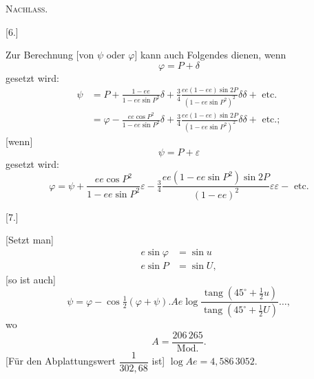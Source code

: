 \begingroup
\clearpage
{}\hfill\textsc{Nachlass.}\hfill\mbox{}\par\bigskip
\begin{center}[6.]\end{center}
Zur Berechnung [von $\psi$ oder $\varphi$] kann auch Folgendes dienen, wenn
\[
\varphi=P+\delta
\]
gesetzt wird:
\[
\begin{aligned}
\psi&=P+\frac{1-ee}{1-ee\sin P^2}\delta+\tfrac34\frac{ee(1-ee)\sin2P}{(1-ee\sin P^2)^2}\delta\delta+\text{ etc.}\\[5pt]
&=\varphi-\frac{ee\cos P^2}{1-ee\sin P^2}\delta+\tfrac34\frac{ee(1-ee)\sin2P}{(1-ee\sin P^2)^2}\delta\delta+\text{ etc.};
\end{aligned}
\]
[wenn]
\[
\psi=P+\varepsilon
\]
gesetzt wird:
\[
\varphi=\psi+\frac{ee\cos P^2}{1-ee\sin P^2}\varepsilon-\tfrac34\frac{ee(1-ee\sin P^2)\sin2P}{(1-ee)^2}\varepsilon\varepsilon-\text{ etc.}
\]
\bigskip
\begin{center}[7.]\end{center}
[Setzt man]
\[
\begin{aligned}
e\sin\varphi&=\sin u\\
e\sin P&=\sin U,
\end{aligned}
\]
[so ist auch]
\[
\psi=\varphi-\cos\tfrac12(\varphi+\psi).Ae\log\frac{\operatorname{tang}(45^\circ+\frac12u)}{\operatorname{tang}(45^\circ+\frac12U)}\ldots,
\]
wo
\[
A=\frac{206\,265}{\mathrm{Mod.}}.
\]
[Für den Abplattungswert $\dfrac1{302{,}68}$ ist] $\log Ae=4{,}586\,3052$.

